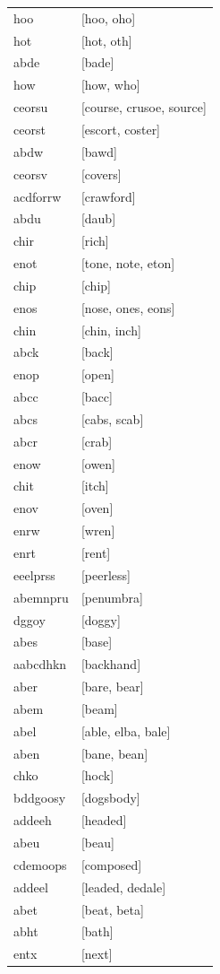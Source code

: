 \documentclass{article}
\begin{document}
\begin{tabular}{ll}
hoo & [hoo, oho] \\
hot & [hot, oth] \\
abde & [bade] \\
how & [how, who] \\
ceorsu & [course, crusoe, source] \\
ceorst & [escort, coster] \\
abdw & [bawd] \\
ceorsv & [covers] \\
acdforrw & [crawford] \\
abdu & [daub] \\
chir & [rich] \\
enot & [tone, note, eton] \\
chip & [chip] \\
enos & [nose, ones, eons] \\
chin & [chin, inch] \\
abck & [back] \\
enop & [open] \\
abcc & [bacc] \\
abcs & [cabs, scab] \\
abcr & [crab] \\
enow & [owen] \\
chit & [itch] \\
enov & [oven] \\
enrw & [wren] \\
enrt & [rent] \\
eeelprss & [peerless] \\
abemnpru & [penumbra] \\
dggoy & [doggy] \\
abes & [base] \\
aabcdhkn & [backhand] \\
aber & [bare, bear] \\
abem & [beam] \\
abel & [able, elba, bale] \\
aben & [bane, bean] \\
chko & [hock] \\
bddgoosy & [dogsbody] \\
addeeh & [headed] \\
abeu & [beau] \\
cdemoops & [composed] \\
addeel & [leaded, dedale] \\
abet & [beat, beta] \\
abht & [bath] \\
entx & [next] \\

\end{tabular}
\end{document}
